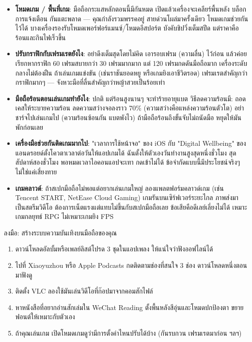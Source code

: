\begin{itemize}
  \item \textbf{โหมดเกม / พื้นที่เกม}: มือถือกระแสหลักตอนนี้มีกันหมด เปิดแล้วเครื่องจะเคลียร์พื้นหลัง บล็อกการแจ้งเตือน กันแตะพลาด — คุณกำลังรวมพรรคอยู่ สายด่วนโผล่มาครั้งเดียว โหมดเกมช่วยกันไว้ได้ บางเครื่องรองรับโหมดเพอร์ฟอร์แมนซ์/โหมดอีสปอร์ต บังคับชิปวิ่งเต็มสปีด แต่ราคาคือร้อนและกินไฟเร็วขึ้น
  \item \textbf{ปรับกราฟิกกับเฟรมเรตยังไง}: อย่าดึงเต็มสุดโดยไม่คิด เอารอบเฟรม (ความลื่น) ไว้ก่อน แล้วค่อยเรียกหากราฟิก 60 เฟรมสบายกว่า 30 เฟรมมากมาก แต่ 120 เฟรมกดดันมือถือมาก เครื่องระดับกลางไม่ต้องฝืน ถ้าเล่นเกมแข่งขัน (เช่นราชันยอดหยู หรือเกมยิงเอาชีวิตรอด) เฟรมเรตสำคัญกว่ากราฟิกมากๆ — จังหวะมือที่ลื่นสำคัญกว่าหญ้าสวยเป็นร้อยเท่า
  \item \textbf{มือถือร้อนตอนเล่นเกมทำยังไง}: ปกติ แต่ร้อนสูงนานๆ จะทำร้ายอายุแบต วิธีลดความร้อนมี: ถอดเคสให้ระบายความร้อน ลดความสว่างจอลงราว 70\% (ความสว่างคือแหล่งความร้อนตัวโต) อย่าชาร์จไปเล่นเกมไป (ความร้อนซ้อนกัน แบตพังไว) ถ้ามือถือร้อนถึงขั้นจับไม่ถนัดมือ หยุดให้มันพักก่อนเลย
  \item \textbf{เครื่องมือช่วยกันติดเกมมากไป}: "เวลาการใช้หน้าจอ" ของ iOS กับ "Digital Wellbeing" ของแอนดรอยด์ตั้งโควตาเวลาต่อวันให้แอปเกมได้ ฉันตั้งให้ตัวเองวันทำงานสูงสุดหนึ่งชั่วโมง สุดสัปดาห์สองชั่วโมง พอหมดเวลาไอคอนแอปจะเทา กดเข้าไม่ได้ ข้อจำกัดแบบนี้มีประโยชน์จริงๆ ไม่ใช่แค่เสี่ยงทาย
  \item \textbf{เกมคลาวด์}: ถ้าสเปกมือถือไม่พอแต่อยากเล่นเกมใหญ่ ลองแพลตฟอร์มคลาวด์เกม (เช่น Tencent START, NetEase Cloud Gaming) เกมรันบนเซิร์ฟเวอร์ระยะไกล ภาพส่งมาเป็นสตรีมวิดีโอ ต้องการเน็ตแรงแต่แทบไม่ขึ้นกับสเปกมือถือเลย ข้อเสียคือดีเลย์เลี่ยงไม่ได้ เหมาะเกมกลยุทธ์ RPG ไม่เหมาะเกมยิง FPS
\end{itemize}

\begin{tcbpractice}{ลงมือ: สร้างระบบความบันเทิงบนมือถือของคุณ}
\begin{enumerate}
  \item ดาวน์โหลดอัลบั้มหรือเพลย์ลิสต์โปรด 3 ชุดในแอปเพลง ให้แน่ใจว่าฟังออฟไลน์ได้
  \item ไปที่ Xiaoyuzhou หรือ Apple Podcasts กดติดตามช่องที่สนใจ 3 ช่อง ดาวน์โหลดหนึ่งตอนมาฟังดู
  \item ติดตั้ง VLC ลองใช้มันเล่นวิดีโอที่ก๊อปมาจากคอมสักไฟล์
  \item หาหนังสือที่อยากอ่านสักเล่มใน WeChat Reading ตั้งพื้นหลังสีอุ่นและโหมดปกป้องตา ขยายฟอนต์ให้เหมาะกับตัวเอง
  \item ถ้าคุณเล่นเกม เปิดโหมดเกมดูว่ามีการตั้งค่าไหนปรับได้บ้าง (กันรบกวน เฟรมเรตมาก่อน ฯลฯ)
\end{enumerate}

\end{tcbpractice}

